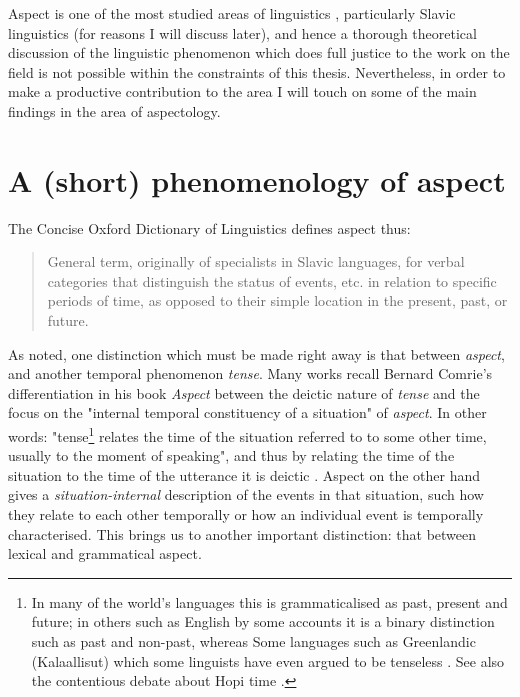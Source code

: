 Aspect is one of the most studied areas of linguistics \citep{Sasse2002RecentAI}, particularly Slavic linguistics (for reasons I will discuss later), and hence a thorough theoretical discussion of the linguistic phenomenon which does full justice to the work on the field is not possible within the constraints of this thesis. Nevertheless, in order to make a productive contribution to the area I will touch on some of the main findings in the area of aspectology.
\section{A (short) phenomenology of aspect}
The Concise Oxford Dictionary of Linguistics \citep{matthews2014concise} defines aspect thus: 

\begin{quotation}
    General term, originally of specialists in Slavic languages, for verbal categories that distinguish the status of events, etc. in relation to specific periods of time, as opposed to their simple location in the present, past, or future.
\end{quotation}

As noted, one distinction which must be made right away is that between \emph{aspect}, and another temporal phenomenon \emph{tense}. Many works recall Bernard Comrie's differentiation in his book \emph{Aspect} \citep{comrie1976aspect} between the deictic nature of \emph{tense} and the focus on the "internal temporal constituency of a situation" of \emph{aspect}. In other words: "tense\footnote{In many of the world's languages this is grammaticalised as past, present and future; in others such as English by some accounts \citep{jespersen2013essentials} it is a binary distinction such as past and non-past, whereas Some languages such as Greenlandic (Kalaallisut) which some linguists have even argued to be tenseless \citet{10.1093/jos/ffh029}. See also the contentious debate about Hopi time \citet{whorf-writings, hopitime}. } relates the time of the situation referred to to some other time, usually to the moment of speaking", and thus by relating the time of the situation to the time of the utterance it is deictic \citep{comrie1976aspect}. Aspect on the other hand gives a \emph{situation-internal} description of the events in that situation, such how they relate to each other temporally or how an individual event is temporally characterised. This brings us to another important distinction: that between lexical and grammatical aspect.


